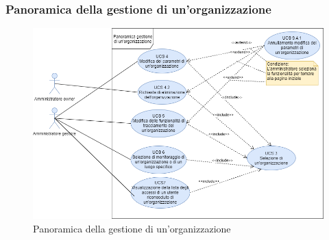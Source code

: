 \newpage
\subsubsection{Panoramica della gestione di un'organizzazione}%
\begin{figure}[h]
	\centering
    \includegraphics[scale=0.53]{sezioni/UseCase/Immagini/Panoramica gestione organizzazione.png}
    \caption{Panoramica della gestione di un'organizzazione}
\end{figure}
